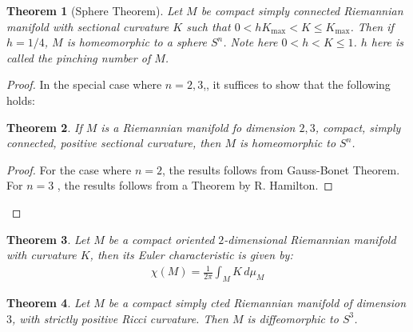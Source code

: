 \documentclass[11pt]{book}
\theoremstyle{break}
\theoremstyle{break}
\newtheorem{thm}{Theorem}[section]
\begin{document}
\begin{thm}[Sphere Theorem]
Let $M$ be compact simply connected Riemannian manifold with sectional curvature $K$ such that $0<hK_{\max} < K  \leq K_{\max}$. Then if $h = 1/4$, $M$ is homeomorphic to a sphere $S^n$. Note here $0 < h < K \leq 1$. $h$ here is called the pinching number of $M$. 
\end{thm}
\begin{proof}
In the special case where $n = 2,3$,, it suffices to show that the following holds:
\begin{thm}
If $M$ is a Riemannian manifold fo dimension $2,3$, compact, simply connected, positive sectional curvature, then $M$ is homeomorphic to $S^n$. 
\end{thm}
\begin{proof}
For the case where $n = 2$, the results follows from Gauss-Bonet Theorem. For $n =3$ , the results follows from a Theorem by R. Hamilton. 
\end{proof}
\end{proof}

\begin{thm}
Let $M$ be a compact oriented $2$-dimensional Riemannian manifold with curvature $K$, then its Euler characteristic is given by:
\begin{align*}
\chi(M) = \frac{1}{2\pi} \int_M K \, d\mu_M
\end{align*}
\end{thm}

\begin{thm}
Let $M$ be a compact simply cted Riemannian manifold of dimension $3$, with strictly positive Ricci curvature. Then $M$ is diffeomorphic to $S^3$. 
\end{thm}
\end{document}
